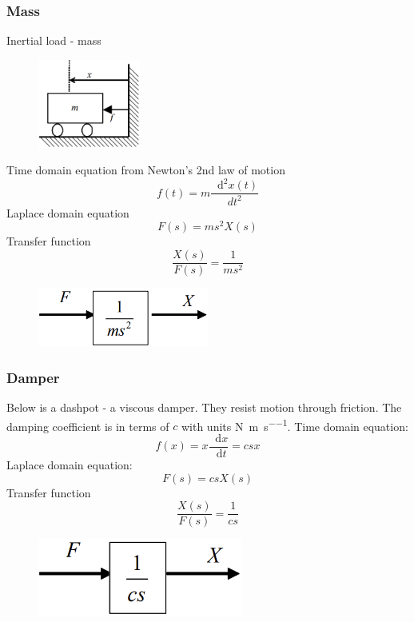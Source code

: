\documentclass[class=report, crop=false, 12pt,a4paper, tikz, border=4mm]{standalone}
\newcommand{\dif}{\mathop{}\!\mathrm{d}}
\begin{document}
\subsubsection{Mass}
Inertial load - mass
\begin{figure}[H]
  \centering
  \includegraphics[width = 0.3\textwidth]{../img/diagram2.png}
\end{figure}
Time domain equation from Newton's 2nd law of motion
\begin{equation}
  f(t) = m \frac{\dif^2x(t)}{dt^2}
\end{equation}
Laplace domain equation
\begin{equation}
  F(s) = ms^2 X(s)
\end{equation}
Transfer function
\begin{equation}
  \frac{X(s)}{F(s)} = \frac{1}{ms^2}
\end{equation}
\begin{figure}[H]
  \centering
  \includegraphics[width = 0.5\textwidth]{../img/blockdiagram13.png}
\end{figure}
\subsubsection{Damper}
Below is a dashpot - a viscous damper. They resist motion through friction. The damping coefficient is in terms of $c$ with units \si{\newton\per\meter\per\second}. Time domain equation:
\begin{equation}
  f(x) = x\frac{\dif x }{\dif t} = csx
\end{equation}
Laplace domain equation:
\begin{equation}
  F(s) = csX(s)
\end{equation}
Transfer function
\begin{equation}
  \frac{X(s)}{F(s)} = \frac{1}{cs}
\end{equation}
\begin{figure}[H]
  \centering
  \includegraphics[width = 0.6\textwidth]{../img/blockdiagram14.png}
\end{figure}
\end{document}

